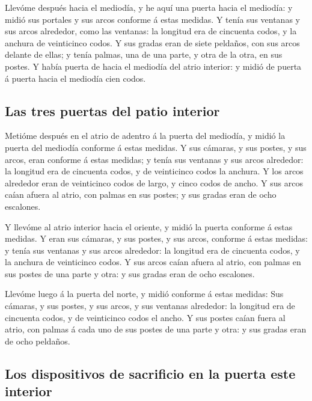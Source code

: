  Llevóme después hacia el mediodía, y he aquí una puerta
hacia el mediodía: y midió sus portales y sus arcos conforme á estas
medidas.  Y tenía sus ventanas y sus arcos alrededor, como
las ventanas: la longitud era de cincuenta codos, y la anchura de
veinticinco codos.  Y sus gradas eran de siete peldaños,
con sus arcos delante de ellas; y tenía palmas, una de una parte, y otra
de la otra, en sus postes.  Y había puerta de hacia el
mediodía del atrio interior: y midió de puerta á puerta hacia el
mediodía cien codos.

\hypertarget{las-tres-puertas-del-patio-interior}{%
\subsection{Las tres puertas del patio
interior}\label{las-tres-puertas-del-patio-interior}}

 Metióme después en el atrio de adentro á la puerta del
mediodía, y midió la puerta del mediodía conforme á estas medidas.
 Y sus cámaras, y sus postes, y sus arcos, eran conforme á
estas medidas; y tenía sus ventanas y sus arcos alrededor: la longitud
era de cincuenta codos, y de veinticinco codos la anchura. 
Y los arcos alrededor eran de veinticinco codos de largo, y cinco codos
de ancho.  Y sus arcos caían afuera al atrio, con palmas en
sus postes; y sus gradas eran de ocho escalones.

 Y llevóme al atrio interior hacia el oriente, y midió la
puerta conforme á estas medidas.  Y eran sus cámaras, y sus
postes, y sus arcos, conforme á estas medidas: y tenía sus ventanas y
sus arcos alrededor: la longitud era de cincuenta codos, y la anchura de
veinticinco codos.  Y sus arcos caían afuera al atrio, con
palmas en sus postes de una parte y otra: y sus gradas eran de ocho
escalones.

 Llevóme luego á la puerta del norte, y midió conforme á
estas medidas:  Sus cámaras, y sus postes, y sus arcos, y
sus ventanas alrededor: la longitud era de cincuenta codos, y de
veinticinco codos el ancho.  Y sus postes caían fuera al
atrio, con palmas á cada uno de sus postes de una parte y otra: y sus
gradas eran de ocho peldaños.

\hypertarget{los-dispositivos-de-sacrificio-en-la-puerta-este-interior}{%
\subsection{Los dispositivos de sacrificio en la puerta este
interior}\label{los-dispositivos-de-sacrificio-en-la-puerta-este-interior}}

